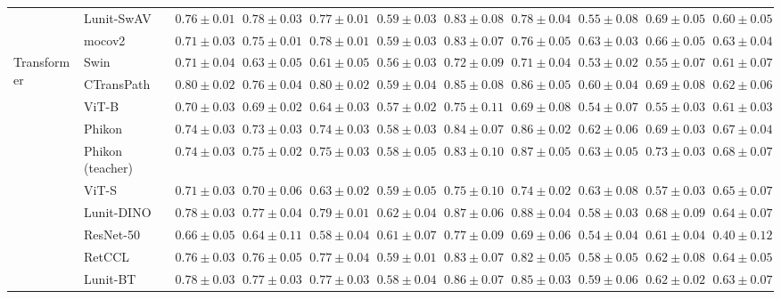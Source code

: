 \begin{tabular}{ll|cccc|c|cccc}
 & Lunit-SwAV & $0.76 \pm 0.01$ & $0.78 \pm 0.03$ & $0.77 \pm 0.01$ & $0.59 \pm 0.03$ & $0.83 \pm 0.08$ & $0.78 \pm 0.04$ & $0.55 \pm 0.08$ & $0.69 \pm 0.05$ & $0.60 \pm 0.05$ \\
 & mocov2 & $0.71 \pm 0.03$ & $0.75 \pm 0.01$ & $0.78 \pm 0.01$ & $0.59 \pm 0.03$ & $0.83 \pm 0.07$ & $0.76 \pm 0.05$ & $0.63 \pm 0.03$ & $0.66 \pm 0.05$ & $0.63 \pm 0.04$ \\
\cline{1-11}
\multirow[t]{12}{*}{Transformer} & Swin & $0.71 \pm 0.04$ & $0.63 \pm 0.05$ & $0.61 \pm 0.05$ & $0.56 \pm 0.03$ & $0.72 \pm 0.09$ & $0.71 \pm 0.04$ & $0.53 \pm 0.02$ & $0.55 \pm 0.07$ & $0.61 \pm 0.07$ \\
 & CTransPath & $\mathbf{0.80 \pm 0.02}$ & $0.76 \pm 0.04$ & $\mathbf{0.80 \pm 0.02}$ & $0.59 \pm 0.04$ & $0.85 \pm 0.08$ & $0.86 \pm 0.05$ & $0.60 \pm 0.04$ & $0.69 \pm 0.08$ & $0.62 \pm 0.06$ \\
 & ViT-B & $0.70 \pm 0.03$ & $0.69 \pm 0.02$ & $0.64 \pm 0.03$ & $0.57 \pm 0.02$ & $0.75 \pm 0.11$ & $0.69 \pm 0.08$ & $0.54 \pm 0.07$ & $0.55 \pm 0.03$ & $0.61 \pm 0.03$ \\
 & Phikon & $0.74 \pm 0.03$ & $0.73 \pm 0.03$ & $0.74 \pm 0.03$ & $0.58 \pm 0.03$ & $0.84 \pm 0.07$ & $0.86 \pm 0.02$ & $0.62 \pm 0.06$ & $0.69 \pm 0.03$ & $0.67 \pm 0.04$ \\
 & Phikon (teacher) & $0.74 \pm 0.03$ & $0.75 \pm 0.02$ & $0.75 \pm 0.03$ & $0.58 \pm 0.05$ & $0.83 \pm 0.10$ & $0.87 \pm 0.05$ & $\mathbf{0.63 \pm 0.05}$ & $\mathbf{0.73 \pm 0.03}$ & $\mathbf{0.68 \pm 0.07}$ \\
 & ViT-S & $0.71 \pm 0.03$ & $0.70 \pm 0.06$ & $0.63 \pm 0.02$ & $0.59 \pm 0.05$ & $0.75 \pm 0.10$ & $0.74 \pm 0.02$ & $0.63 \pm 0.08$ & $0.57 \pm 0.03$ & $0.65 \pm 0.07$ \\
 & Lunit-DINO & $0.78 \pm 0.03$ & $0.77 \pm 0.04$ & $0.79 \pm 0.01$ & $0.62 \pm 0.04$ & $\mathbf{0.87 \pm 0.06}$ & $\mathbf{0.88 \pm 0.04}$ & $0.58 \pm 0.03$ & $0.68 \pm 0.09$ & $0.64 \pm 0.07$ \\
 & ResNet-50 & $0.66 \pm 0.05$ & $0.64 \pm 0.11$ & $0.58 \pm 0.04$ & $0.61 \pm 0.07$ & $0.77 \pm 0.09$ & $0.69 \pm 0.06$ & $0.54 \pm 0.04$ & $0.61 \pm 0.04$ & $0.40 \pm 0.12$ \\
 & RetCCL & $0.76 \pm 0.03$ & $0.76 \pm 0.05$ & $0.77 \pm 0.04$ & $0.59 \pm 0.01$ & $0.83 \pm 0.07$ & $0.82 \pm 0.05$ & $0.58 \pm 0.05$ & $0.62 \pm 0.08$ & $0.64 \pm 0.05$ \\
 & Lunit-BT & $0.78 \pm 0.03$ & $0.77 \pm 0.03$ & $0.77 \pm 0.03$ & $0.58 \pm 0.04$ & $0.86 \pm 0.07$ & $0.85 \pm 0.03$ & $0.59 \pm 0.06$ & $0.62 \pm 0.02$ & $0.63 \pm 0.07$ \\

\end{tabular}

